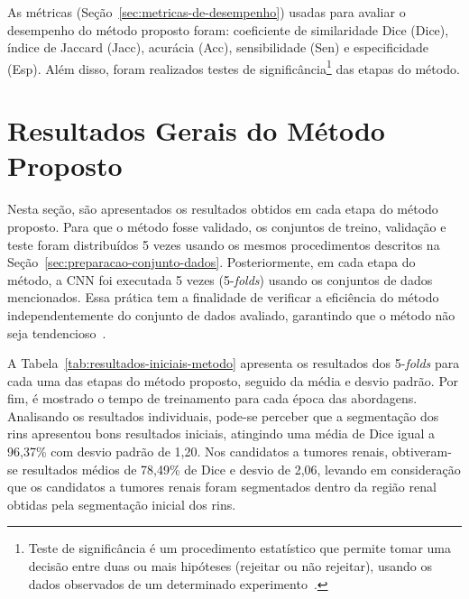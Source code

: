 As métricas (Seção~\ref{sec:metricas-de-desempenho}) usadas para avaliar o desempenho do método proposto foram: coeficiente de similaridade Dice (Dice), índice de Jaccard (Jacc), acurácia (Acc), sensibilidade (Sen) e especificidade (Esp). Além disso, foram realizados testes de significância\footnote{Teste de significância é um procedimento estatístico que permite tomar uma decisão entre duas ou mais hipóteses (rejeitar ou não rejeitar), usando os dados observados de um determinado experimento~\cite{statistical1982, zou2003}.} das etapas do método.

\section{Resultados Gerais do Método Proposto}
\label{sec:resultados-metodo-proposto}

Nesta seção, são apresentados os resultados obtidos em cada etapa do método proposto. Para que o método fosse validado, os conjuntos de treino, validação e teste foram distribuídos 5 vezes usando os mesmos procedimentos descritos na Seção~\ref{sec:preparacao-conjunto-dados}. Posteriormente, em cada etapa do método, a CNN foi executada 5 vezes (5-\textit{folds}) usando os conjuntos de dados mencionados. Essa prática tem a finalidade de verificar a eficiência do método independentemente do conjunto de dados avaliado, garantindo que o método não seja tendencioso~\cite{burman1989comparative}. %

A Tabela~\ref{tab:resultados-iniciais-metodo} apresenta os resultados dos 5-\textit{folds} para cada uma das etapas do método proposto, seguido da média e desvio padrão. Por fim, é mostrado o tempo de treinamento para cada época das abordagens. Analisando os resultados individuais, pode-se perceber que a segmentação dos rins apresentou bons resultados iniciais, atingindo uma média de Dice igual a 96,37\% com desvio padrão de 1,20. Nos candidatos a tumores renais, obtiveram-se resultados médios de 78,49\% de Dice e desvio de 2,06, levando em consideração que os candidatos a tumores renais foram segmentados dentro da região renal obtidas pela segmentação inicial dos rins.

